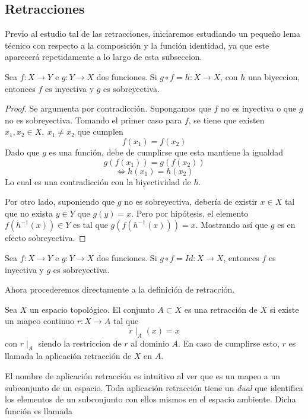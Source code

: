 \subsection{Retracciones}
Previo al estudio tal de las retracciones, iniciaremos estudiando un
pequeño lema técnico con respecto a la composición y la función
identidad, ya que este aparecerá repetidamente a lo largo de esta
subseccion.
\begin{lema}
  Sea \(f : X \to Y\) e \(g : Y \to X\) dos funciones. Si \( g \circ f =
  h : X \to X \), con \(h\) una biyeccion, entonces \(f\) es inyectiva y
  \(g\) es sobreyectiva.
\end{lema}
\begin{proof}
  Se argumenta por contradicción. Supongamos que \(f\) no es inyectiva o
  que \(g\) no es sobreyectiva. Tomando el primer caso para \(f\), se
  tiene que existen \(x_1 , x_2 \in X,\ x_1 \neq x_2\) que cumplen
  \[ f (x_1) = f(x_2) \]
  Dado que \(g\) es una función, debe de cumplirse que esta mantiene la igualdad
  \[ g (f (x_1)) = g (f(x_2)) \]
  \[ \iff h (x_1) = h(x_2) \]
  Lo cual es una contradicción con la biyectividad de \(h\).

  Por otro lado, suponiendo que \(g\) no es sobreyectiva, debería de
  existir \(x \in X\) tal que no exista \( y \in Y\) que \(g (y) = x\).
  Pero por hipótesis, el elemento \(f(h^{-1}(x)) \in Y\) es tal que \(g
  (f (h^{-1}(x))) = x\). Mostrando así que \(g\) es en efecto
  sobreyectiva.
\end{proof}
\begin{corolario} \label{thm:comp-identidad}
  Sea \(f : X \to Y\) e \(g : Y \to X\) dos funciones. Si \( g \circ f =
  Id : X \to X \), entonces \(f\) es inyectiva y \(g\) es sobreyectiva.
\end{corolario}
\noindent Ahora procederemos directamente a la definición
de retracción.
\begin{definicion}[Retracción]
  Sea \(X\) un espacio topológico. El conjunto \(A \subset X\) es una
  retracción de \(X\) si existe un mapeo continuo \(r : X \to A\) tal que
  \[ r \mid_{A} (x) = x \]
  con \(r \mid_{A}\) siendo la restriccion de \(r\) al dominio \(A\). En
  caso de cumplirse esto, \(r\) es llamada la aplicación retracción de
  \(X\) en \(A\).
\end{definicion}
\noindent El nombre de aplicación retracción es intuitivo al ver que es
un mapeo a un subconjunto de un espacio. Toda aplicación retracción
tiene un \emph{dual} que identifica los elementos de un subconjunto con
ellos mismos en el espacio ambiente. Dicha función es llamada
